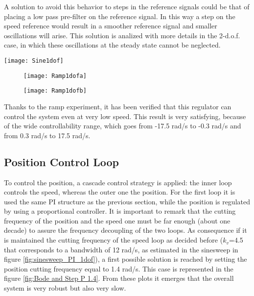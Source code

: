 A solution to avoid this behavior to steps in the reference signals could be that of placing a low pass pre-filter on the reference signal. In this way a step on the speed reference would result in a smoother reference signal and smaller oscillations will arise. This solution is analized with more details in the 2-d.o.f. case, in which these oscillations at the steady state cannot be neglected.
\begin{figure*}[h]
	\centering
	\texttt{[image: Sine1dof]}
	\caption{Sineweep experiment from 0.1 Hz to 10 Hz in 100s}
	\label{fig:sinesweep_PI_1dof}
\end{figure*}

\begin{figure*}[h]
	\centering
	\begin{subfigure}{0.45\columnwidth}
		\texttt{[image: Ramp1dofa]}
	\end{subfigure}
	\begin{subfigure}{0.45\columnwidth}
		\texttt{[image: Ramp1dofb]}
	\end{subfigure}
	\caption{Ramp experiment from 17 rad/s to 0 rad/s in 100s}
	\label{fig:Ramp1dof}
\end{figure*}

Thanks to the ramp experiment, it has been verified that this regulator can control the system even at very low speed. This result is very satisfying, because of the wide controllability range, which goes from -17.5 rad/s to -0.3 rad/s and from 0.3 rad/s to 17.5 rad/s.

\newpage
\subsection{Position Control Loop}
To control the position, a cascade control strategy is applied: the inner loop controls the speed, whereas the outer one the position. For the first loop it is used the same PI structure as the previous section, while the position is regulated by using a proportional controller. It is important to remark that the cutting frequency of the position and the speed one must be far enough (about one decade) to assure the frequency decoupling of the two loops. As consequence if it is maintained the cutting frequency of the speed loop as decided before ($k_v$=4.5 that corresponds to a bandwidth of 12 rad/s, as estimated in the sinesweep in figure \ref{fig:sinesweep_PI_1dof}), a first possible solution is reached by setting the position cutting frequency equal to 1.4 rad/s. This case is represented in the figure \ref{fig:Bode and Step P 1.4}. From these plots it emerges that the overall system is very robust but also very slow.

